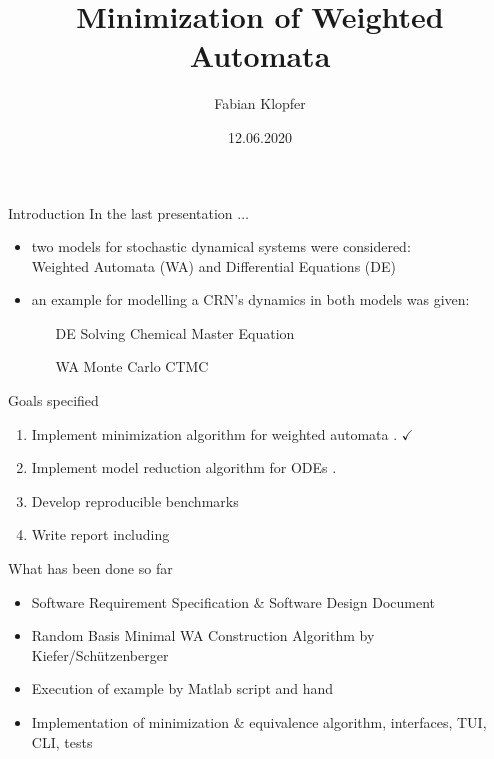 \documentclass[rgb]{beamer}
\title{Minimization of Weighted Automata}
\author{Fabian Klopfer}
\date{12.06.2020}
\institute{Modelling of Complex Self-Organizing Systems Group}
\begin{document}
    \begin{frame}
        \titlepage
    \end{frame}

    \begin{frame}{Introduction}
        In the last presentation $\dots$ \\ \vspace{0.5cm}
        \begin{itemize}
            \item two models for stochastic dynamical systems were considered: \\ \vspace{0.2cm} 
                Weighted Automata (WA) and Differential Equations (DE)\\ \vspace{0.8cm} 
            \item an example for modelling a CRN's dynamics in both models was given: \\
            \vspace{0.3cm} 
            \begin{itemize}
             \item[DE] Solving Chemical Master Equation 
             \item[WA] Monte Carlo CTMC
            \end{itemize}
        \end{itemize}
    \end{frame}
    \begin{frame}{Goals specified}
        \begin{enumerate}
            \item Implement minimization algorithm for weighted automata \autocite{Kiefer2013OnTC}. {\Huge $\checkmark$ }
            \item Implement model reduction algorithm for ODEs \autocite{Cardelli2017MaximalAO}.
            \item Develop reproducible benchmarks
            \item Write report including
        \end{enumerate}
    \end{frame}
    
    \begin{frame}{What has been done so far}
        \begin{itemize}
            \item Software Requirement Specification \& Software Design Document
            \item Random Basis Minimal WA Construction Algorithm by Kiefer/Schützenberger~\autocite{Kiefer2013OnTC}
            \item Execution of example by Matlab script and hand
            \item Implementation of minimization \& equivalence algorithm, interfaces, TUI, CLI, tests
        \end{itemize}
    \end{frame}
    
\end{document}
